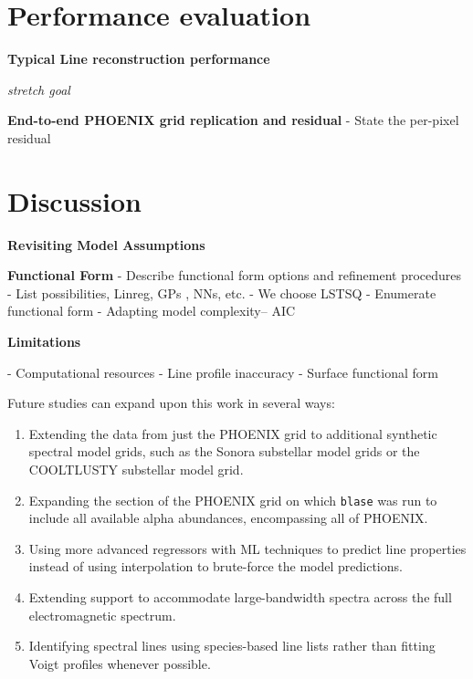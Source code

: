 \documentclass[twocolumn]{aastex631}
\begin{document}
\section{Performance evaluation}

\begin{mdframed}
    \textbf{Typical Line reconstruction performance}
    \textcolor{lightgray}{\blindtext}
\end{mdframed}

\begin{mdframed}
    \emph{stretch goal}\par
    \textbf{End-to-end PHOENIX grid replication and residual}
    - State the per-pixel residual
    \textcolor{lightgray}{\blindtext}
\end{mdframed}


\section{Discussion}
\begin{mdframed}
    \textbf{Revisiting Model Assumptions}

    \textcolor{lightgray}{\blindtext}
\end{mdframed}

\begin{mdframed}
    \textbf{Functional Form}
    - Describe functional form options and refinement procedures
    - List possibilities, Linreg, GPs \citep{2023ARA&A..61..329A}, NNs, etc.
    - We choose LSTSQ
    - Enumerate functional form
    - Adapting model complexity-- AIC
    \textcolor{lightgray}{\blindtext}
\end{mdframed}

\begin{mdframed}
    \textbf{Limitations}

    - Computational resources
    - Line profile inaccuracy
    - Surface functional form

    \textcolor{lightgray}{\blindtext}
\end{mdframed}

Future studies can expand upon this work in several ways:
\begin{enumerate}[label=-]
    \item Extending the data from just the PHOENIX grid to additional synthetic spectral
          model grids, such as the Sonora substellar model grids or the COOLTLUSTY substellar model grid.
    \item Expanding the section of the PHOENIX grid on which \texttt{blase} was run to include all available alpha abundances, encompassing all of PHOENIX.
    \item Using more advanced regressors with ML techniques to predict line properties instead of using interpolation to brute-force the model predictions.
    \item Extending support to accommodate large-bandwidth spectra across the full electromagnetic spectrum.
    \item Identifying spectral lines using species-based line lists rather than fitting Voigt profiles whenever possible.
\end{enumerate}
\end{document}
